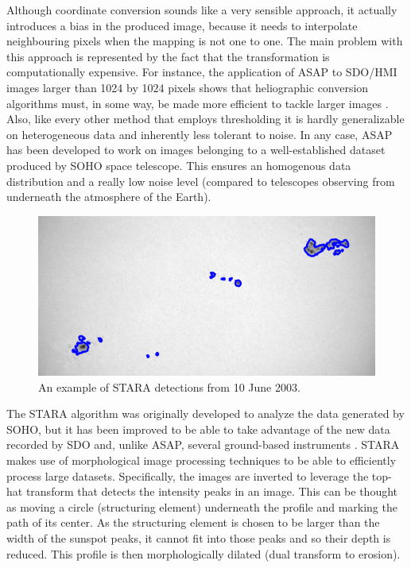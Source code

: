 \bigbreak
\noindent Although coordinate conversion sounds like a very sensible approach, it actually introduces a bias in the produced image, because it needs to interpolate neighbouring pixels when the mapping is not one to one. The main problem with this approach is represented by the fact that the transformation is computationally expensive. For instance, the application of ASAP to SDO/HMI \cite{schou2012design} images larger than 1024 by 1024 pixels shows that heliographic conversion algorithms must, in some way, be made more efficient to tackle larger images \cite{verbeeck2013multi}. Also, like every other method that employs thresholding it is hardly generalizable on heterogeneous data and inherently less tolerant to noise. In any case, ASAP has been developed to work on images belonging to a well-established dataset produced by SOHO space telescope. This ensures an homogenous data distribution and a really low noise level (compared to telescopes observing from underneath the atmosphere of the Earth).
\bigbreak
\begin{figure}[t]
    \centering
    \captionsetup{justification=centering}
    \includegraphics[width=\textwidth]{./pictures/stara-example-detection}
    \caption{An example of STARA detections from 10 June 2003.}
    \label{fig:stara-example}
\end{figure}
\noindent The STARA algorithm was originally developed to analyze the data generated by SOHO, but it has been improved to be able to take advantage of the new data recorded by SDO and, unlike ASAP, several ground-based instruments \cite{ravindra2013digitized}. STARA makes use of morphological image processing techniques \cite{dougherty2003hands} to be able to efficiently process large datasets. Specifically, the images are inverted to leverage the top-hat transform that detects the intensity peaks in an image. This can be thought as moving a circle (structuring element) underneath the profile and marking the path of its center. As the structuring element is chosen to be larger than the width of the sunspot peaks, it cannot fit into those peaks and so their depth is reduced. This profile is then morphologically dilated (dual transform to erosion).
